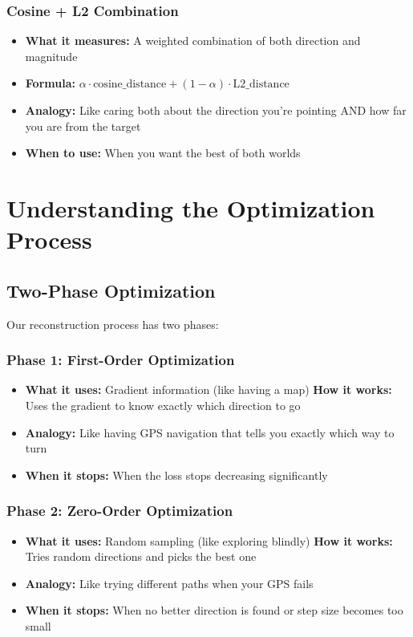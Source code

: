 \documentclass[12pt]{article}
\begin{document}
\subsubsection{Cosine + L2 Combination}
\begin{itemize}
    \item \textbf{What it measures:} A weighted combination of both direction and magnitude
    \item \textbf{Formula:} $\alpha \cdot \text{cosine\_distance} + (1-\alpha) \cdot \text{L2\_distance}$
    \item \textbf{Analogy:} Like caring both about the direction you're pointing AND how far you are from the target
    \item \textbf{When to use:} When you want the best of both worlds
\end{itemize}

\section{Understanding the Optimization Process}

\subsection{Two-Phase Optimization}

Our reconstruction process has two phases:

\subsubsection{Phase 1: First-Order Optimization}
\begin{itemize}
    \item \textbf{What it uses:} Gradient information (like having a map)
    \textbf{How it works:} Uses the gradient to know exactly which direction to go
    \item \textbf{Analogy:} Like having GPS navigation that tells you exactly which way to turn
    \item \textbf{When it stops:} When the loss stops decreasing significantly
\end{itemize}

\subsubsection{Phase 2: Zero-Order Optimization}
\begin{itemize}
    \item \textbf{What it uses:} Random sampling (like exploring blindly)
    \textbf{How it works:} Tries random directions and picks the best one
    \item \textbf{Analogy:} Like trying different paths when your GPS fails
    \item \textbf{When it stops:} When no better direction is found or step size becomes too small
\end{itemize}
\end{document}
